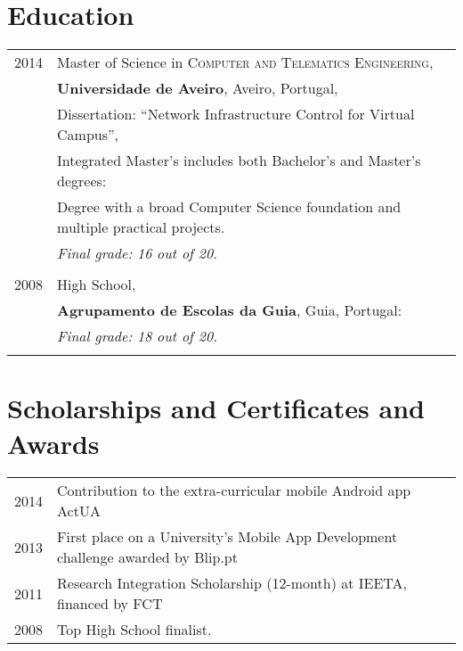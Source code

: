 \documentclass[letter,10pt]{article} %
\begin{document}
\section{Education}

\begin{tabular}{rl}	
\textsc{2014} & Master of Science in \textsc{Computer and Telematics Engineering}, \\
&\textbf{Universidade de Aveiro}, Aveiro, Portugal, \\
& Dissertation: ``Network Infrastructure Control for Virtual Campus'', \\
& Integrated Master's includes both Bachelor's and Master's degrees: \\
& Degree with a broad Computer Science foundation and multiple practical projects.\\
& \textit{Final grade: 16 out of 20.}\\
&\\

\textsc{2008} & High School, \\
&\textbf{Agrupamento de Escolas da Guia}, Guia, Portugal: \\
& \textit{Final grade: 18 out of 20.}\\
&\\
\end{tabular}


\section{Scholarships and Certificates and Awards}

\begin{tabular}{rl}
\textsc{2014} & Contribution to the extra-curricular mobile Android app ActUA \normalsize\\
\textsc{2013} & First place on a University's Mobile App Development challenge awarded by Blip.pt \normalsize\\
\textsc{2011} & Research Integration Scholarship (12-month) at IEETA, financed by FCT \normalsize\\
\textsc{2008} & Top High School finalist. \normalsize\\
\end{tabular} \\

\end{document}
